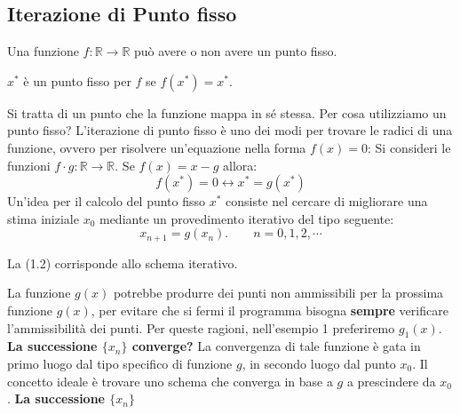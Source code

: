 \subsection{Iterazione di Punto fisso}
Una funzione $\mathit{f}:\mathbb{R}\rightarrow\mathbb{R}$ può avere o non avere un punto fisso.
\begin{definition}
    $x^*$ è un punto fisso per $\mathit{f}$ se $\mathit{f}(x^*) = x^*$.
\end{definition}
Si tratta di un punto che la funzione mappa in sé stessa.
\newpage
Per cosa utilizziamo un punto fisso?
L'iterazione di punto fisso è uno dei modi per trovare le radici di una funzione, ovvero per risolvere un'equazione nella forma $\mathit{f}(x) = 0$:
Si consideri le funzioni $\mathit{f}\cdot\mathit{g}: \mathbb{R} \rightarrow \mathbb{R}$. Se $\mathit{f}(x) = x - \mathit{g}$ allora:
\begin{equation}
    \mathit{f}(x^*) = 0 \leftrightarrow x^* = g(x^*)
\end{equation}
Un'idea per il calcolo del punto fisso $x^*$ consiste nel cercare di migliorare una stima iniziale $x_0$ mediante un provedimento iterativo del tipo seguente:
\begin{equation}
    x_{n+1} = g(x_n). \qquad n=0,1,2,\cdots
\end{equation}
\begin{nb}
    La (1.2) corrisponde allo schema iterativo.
\end{nb}
La funzione $g(x)$ potrebbe produrre dei punti non ammissibili per la prossima funzione $g(x)$, per evitare che si fermi il programma bisogna \textbf{sempre} verificare l'ammissibilità dei punti.
Per queste ragioni, nell'esempio 1 preferiremo $g_1(x)$. 
\newline
\textbf{La successione $\{x_n\}$ converge?} La convergenza di tale funzione è gata in primo luogo dal tipo specifico di funzione $\mathit{g}$, in secondo luogo dal punto $x_0$.
\newline
Il concetto ideale è trovare uno schema che converga in base a $\mathit{g}$ a prescindere da $x_0$.
\newline
\textbf{La successione $\{x_n\}$} \todo{}

